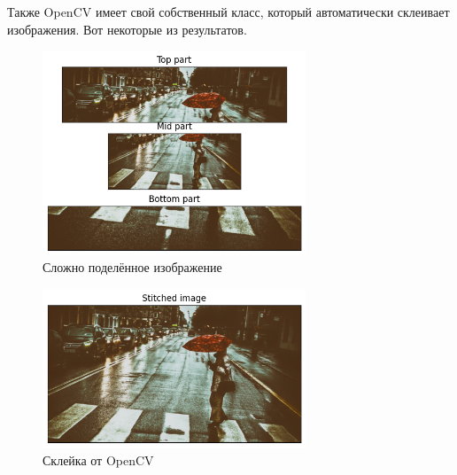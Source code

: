 \documentclass[a4paper,12pt]{article}
\begin{document}
Также OpenCV имеет свой собственный класс, который автоматически склеивает изображения. Вот некоторые из результатов.
\begin{figure}[H]
    \centering \includegraphics[width=0.7\textwidth]{my_images/46.png}
    \caption{Сложно поделённое изображение}
\end{figure}
\begin{figure}[H]
    \centering \includegraphics[width=0.7\textwidth]{my_images/47.png}
    \caption{Склейка от OpenCV}
\end{figure}
\end{document}
